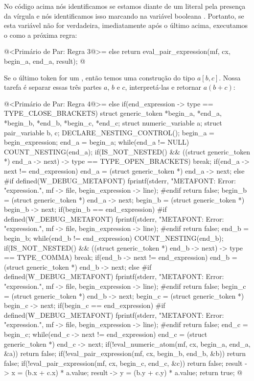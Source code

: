 No código acima nós identificamos se estamos diante de um literal pela
presença da vírgula e nós identificamos isso marcando na variável
booleana . Portanto, se esta variável não for
verdadeira, imediatamente após o último  acima,
executamos o  como a próxima regra:

\iniciocodigo
@<Primário de Par: Regra 3@>=
else{
  return eval_pair_expression(mf, cx, begin_a, end_a, result);
}
@
\fimcodigo

Se o último token for um \monoespaco{]}, então temos uma construção do
tipo $a[b,c]$. Nossa tarefa é separar essas três partes $a$, $b$ e
$c$, interpretá-las e retornar $a(b+c)$:

\iniciocodigo
@<Primário de Par: Regra 4@>=
else if(end_expression -> type == TYPE_CLOSE_BRACKETS){
  struct generic_token *begin_a, *end_a, *begin_b, *end_b, *begin_c,
                       *end_c;
  struct numeric_variable a;
  struct pair_variable b, c;
  DECLARE_NESTING_CONTROL();
  begin_a = begin_expression;
  end_a = begin_a;
  while(end_a != NULL){
    COUNT_NESTING(end_a);
    if(IS_NOT_NESTED() &&
       ((struct generic_token *) end_a -> next) -> type ==
        TYPE_OPEN_BRACKETS)
      break;
    if(end_a -> next != end_expression)
      end_a = (struct generic_token *) end_a -> next;
    else{
#if defined(W_DEBUG_METAFONT)
      fprintf(stderr, "METAFONT: Error: %
              "expression.\n ", mf -> file, begin_expression -> line);
#endif
      return false;
    }
  }
  begin_b = (struct generic_token *) end_a -> next;
  begin_b = (struct generic_token *) begin_b -> next;
  if(begin_b == end_expression){
#if defined(W_DEBUG_METAFONT)
    fprintf(stderr, "METAFONT: Error: %
            "expression.\n ", mf -> file, begin_expression -> line);
#endif
    return false;
  }
  end_b = begin_b;
  while(end_b != end_expression){
    COUNT_NESTING(end_b);
    if(IS_NOT_NESTED() &&
       ((struct generic_token *) end_b -> next) -> type == TYPE_COMMA)
      break;
    if(end_b -> next != end_expression)
      end_b = (struct generic_token *) end_b -> next;
    else{
#if defined(W_DEBUG_METAFONT)
      fprintf(stderr, "METAFONT: Error: %
              "expression.\n ", mf -> file, begin_expression -> line);
#endif
      return false;
    }
  }
  begin_c = (struct generic_token *) end_b -> next;
  begin_c = (struct generic_token *) begin_c -> next;
  if(begin_c == end_expression){
#if defined(W_DEBUG_METAFONT)
    fprintf(stderr, "METAFONT: Error: %
            "expression.\n ", mf -> file, begin_expression -> line);
#endif
    return false;
  }
  end_c = begin_c;
  while(end_c -> next != end_expression)
    end_c = (struct generic_token *) end_c -> next;
  if(!eval_numeric_atom(mf, cx, begin_a, end_a, &a))
    return false;
  if(!eval_pair_expression(mf, cx, begin_b, end_b, &b))
    return false;
  if(!eval_pair_expression(mf, cx, begin_c, end_c, &c))
    return false;
  result -> x = (b.x + c.x) * a.value;
  result -> y = (b.y + c.y) * a.value;
  return true;
}
@
\fimcodigo

